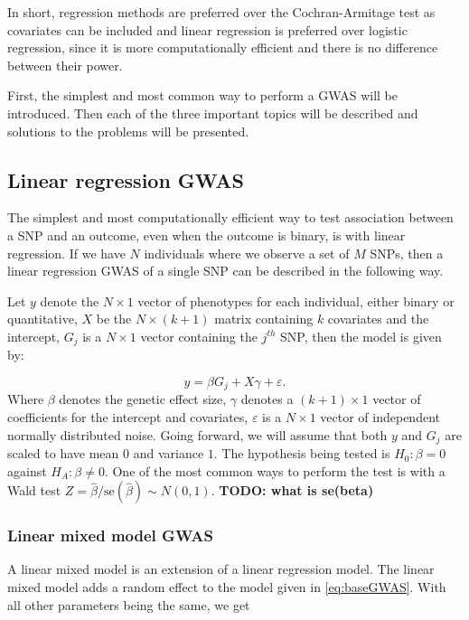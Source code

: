 In short, regression methods are preferred over the Cochran-Armitage test as covariates can be included and linear regression is preferred over logistic regression, since it is more computationally efficient and there is no difference between their power\cite{sikorska2013gwas,prive2019making,balding2006tutorial}.

First, the simplest and most common way to perform a GWAS will be introduced. Then each of the three important topics will be described and solutions to the problems will be presented.

\subsection{Linear regression GWAS} \label{sec:GWAS:LinReg}
The simplest and most computationally efficient way to test association between a SNP and an outcome, even when the outcome is binary, is with linear regression. If we have $ N $ individuals where we observe a set of $ M $ SNPs, then a linear regression GWAS of a single SNP can be described in the following way.

Let $ y $ denote the $ N\times1 $ vector of phenotypes for each individual, either binary or quantitative, $ X $ be the $ N \times (k+1) $ matrix containing $ k $ covariates and the intercept, $ G_j $ is a $ N\times 1 $ vector containing the $ j^{th} $ SNP, then the model is given by:

\begin{equation}\label{eq:baseGWAS}
y = \beta G_{j} +  X\gamma + \varepsilon.
\end{equation}
Where $ \beta $ denotes the genetic effect size, $ \gamma $ denotes a $ (k + 1) 
\times 1$ vector of coefficients for the intercept and covariates, $ 
\varepsilon $ is a $ N \times 1 $ vector of independent normally distributed 
noise. Going forward, we will assume that both $ y $ and $ G_j $ are scaled to 
have mean $ 0 $ and variance $ 1 $. The hypothesis being tested is $ H_0: \beta 
= 0 $ against $ H_A: \beta \neq 0 $. One of the most common ways to perform the 
test is with a Wald test $ Z = \hat{\beta}/\text{se}(\hat{\beta}) \sim N(0,1)$. 
\textbf{TODO: what is se(beta)} 



\subsubsection{Linear mixed model GWAS} 
A linear mixed model is an extension of a linear regression model. The linear mixed model adds a random effect to the model given in \cref{eq:baseGWAS}. With all other parameters being the same, we get


